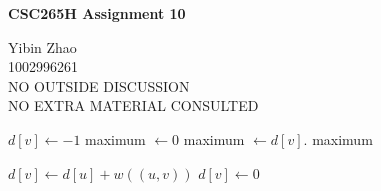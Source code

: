 \documentclass[10pt]{article}
\begin{document}
\begin{center}
{\bf \Large \bf CSC265H Assignment 10}
\end{center}

\noindent
Yibin Zhao\\
1002996261\\
NO OUTSIDE DISCUSSION\\
NO EXTRA MATERIAL CONSULTED\\

\begin{comment}
	Give an algorithm that, given a directed graph $G=(V,E)$ which contains no
	directed cycle and a weight function $w: E \rightarrow \mathbb{R}$, find
	a maximum weight path in $O(|V|+|E|)$ time.

	Prove that your algorithm is correct and has the required time complexity.
\end{comment}

\begin{algorithmic}[1]
			\State $d[v] \gets -1$
		\EndFor
		\State maximum $\gets 0$
				\State {}
					\State maximum $\gets d[v]$.
				\EndIf
			\EndIf
		\EndFor
		\State \Return maximum
	\EndFunction
\end{algorithmic}

\vspace{5mm}

\begin{algorithmic}[1]
				\State {}
			\EndIf
				\State $d[v] \gets d[u] + w((u,v))$ 
			\EndIf
		\EndFor
			\State $d[v] \gets 0$
		\EndIf
	\EndFunction
\end{algorithmic}
\end{document}
